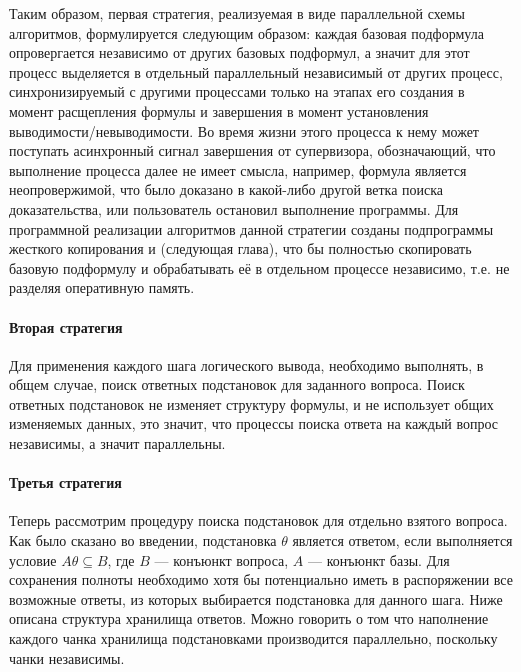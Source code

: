 Таким образом, первая стратегия, реализуемая в виде параллельной схемы алгоритмов, формулируется следующим образом: каждая базовая подформула  опровергается независимо от других базовых подформул, а значит для этот процесс выделяется в отдельный параллельный независимый от других процесс, синхронизируемый с другими процессами только  на этапах его создания в момент расщепления формулы и завершения в момент установления выводимости/невыводимости. Во время жизни этого процесса к нему может поступать асинхронный сигнал завершения от супервизора, обозначающий, что выполнение процесса далее не имеет смысла, например, формула является неопровержимой, что было доказано в какой-либо другой ветка поиска доказательства, или пользователь остановил выполнение программы. Для программной реализации алгоритмов данной стратегии созданы подпрограммы жесткого копирования и  (следующая глава), что бы полностью скопировать базовую подформулу и обрабатывать её в отдельном процессе независимо, т.е. не разделяя оперативную память.


\paragraph{Вторая стратегия}
Для применения каждого шага логического вывода, необходимо выполнять, в общем случае, поиск ответных подстановок для заданного вопроса. Поиск ответных подстановок не изменяет структуру формулы, и не использует общих изменяемых данных, это значит, что процессы поиска ответа на каждый вопрос независимы, а значит параллельны. 


\paragraph{Третья стратегия}
Теперь рассмотрим процедуру поиска подстановок для отдельно взятого вопроса. Как было сказано во введении, подстановка $\theta$ является ответом, если выполняется условие $A\theta \subseteq B$, где $B$ --- конъюнкт вопроса, $A$ --- конъюнкт базы. Для сохранения полноты необходимо хотя бы потенциально иметь в распоряжении все возможные ответы, из которых выбирается подстановка для данного шага. Ниже описана структура хранилища ответов. Можно говорить о том что наполнение каждого чанка хранилища подстановками производится параллельно, поскольку чанки независимы.

